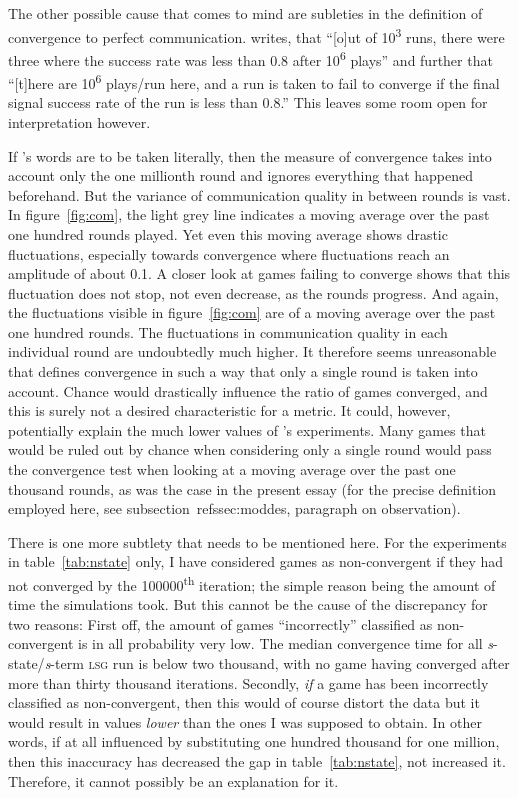 \documentclass[
	DIV=calc,
	BCOR=0mm,
	pagesize,
]{scrartcl}
\newcommand{\lsg}{\textsc{lsg}}
\newcommand{\nslsg}[1]{\textit{#1}-state/\textit{#1}-term \lsg}
\begin{document}
The other possible cause that comes to mind are subleties in the definition of convergence to perfect communication.
\citet[sec.~2, unpaginated preprint]{barrett_numerical_2006} writes, that ``[o]ut of 10\textsuperscript{3} runs, there were three where the success rate was less than 0.8 after 10\textsuperscript{6} plays'' and further that ``[t]here are 10\textsuperscript{6} plays/run here, and a run is taken to fail to converge if the final signal success rate of the run is less than 0.8.''
This leaves some room open for interpretation however.

If \citeauthor{barrett_numerical_2006}'s words are to be taken literally, then the measure of convergence takes into account only the one millionth round and ignores everything that happened beforehand.
But the variance of communication quality in between rounds is vast.
In figure~\ref{fig:com}, the light grey line indicates a moving average over the past one hundred rounds played.
Yet even this moving average shows drastic fluctuations, especially towards convergence where fluctuations reach an amplitude of about 0.1.
A closer look at games failing to converge shows that this fluctuation does not stop, not even decrease, as the rounds progress.
And again, the fluctuations visible in figure~\ref{fig:com} are of a moving average over the past one hundred rounds.
The fluctuations in communication quality in each individual round are undoubtedly much higher.
It therefore seems unreasonable that \citeauthor{barrett_numerical_2006} defines convergence in such a way that only a single round is taken into account.
Chance would drastically influence the ratio of games converged, and this is surely not a desired characteristic for a metric.
It could, however, potentially explain the much lower values of \citeauthor{barrett_numerical_2006}'s experiments.
Many games that would be ruled out by chance when considering only a single round would pass the convergence test when looking at a moving average over the past one thousand rounds, as was the case in the present essay (for the precise definition employed here, see subsection~ref{ssec:moddes}, paragraph on observation).

There is one more subtlety that needs to be mentioned here.
For the experiments in table~\ref{tab:nstate} only, I have considered games as non-convergent if they had not converged by the 100000\textsuperscript{th} iteration; the simple reason being the amount of time the simulations took.
But this cannot be the cause of the discrepancy for two reasons:
First off, the amount of games ``incorrectly'' classified as non-convergent is in all probability very low.
The median convergence time for all \nslsg s run is below two thousand, with no game having converged after more than thirty thousand iterations.
Secondly, \emph{if} a game has been incorrectly classified as non-convergent, then this would of course distort the data but it would result in values \emph{lower} than the ones I was supposed to obtain.
In other words, if at all influenced by substituting one hundred thousand for one million, then this inaccuracy has decreased the gap in table~\ref{tab:nstate}, not increased it.
Therefore, it cannot possibly be an explanation for it.
\end{document}
